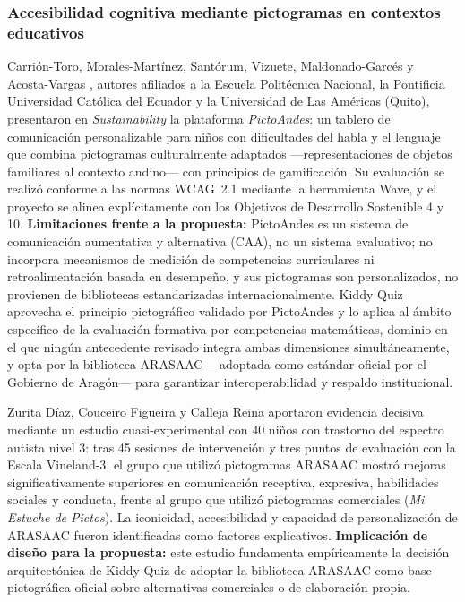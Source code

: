 \subsubsection{Accesibilidad cognitiva mediante pictogramas en contextos educativos}

Carrión-Toro, Morales-Martínez, Santórum, Vizuete, Maldonado-Garcés y Acosta-Vargas \cite{carriontoro2025pictoandes}, autores afiliados a la Escuela Politécnica Nacional, la Pontificia Universidad Católica del Ecuador y la Universidad de Las Américas (Quito), presentaron en \textit{Sustainability} la plataforma \textit{PictoAndes}: un tablero de comunicación personalizable para niños con dificultades del habla y el lenguaje que combina pictogramas culturalmente adaptados ---representaciones de objetos familiares al contexto andino--- con principios de gamificación. Su evaluación se realizó conforme a las normas WCAG~2.1 mediante la herramienta Wave, y el proyecto se alinea explícitamente con los Objetivos de Desarrollo Sostenible 4 y 10. \textbf{Limitaciones frente a la propuesta:} PictoAndes es un sistema de comunicación aumentativa y alternativa (CAA), no un sistema evaluativo; no incorpora mecanismos de medición de competencias curriculares ni retroalimentación basada en desempeño, y sus pictogramas son personalizados, no provienen de bibliotecas estandarizadas internacionalmente. Kiddy Quiz aprovecha el principio pictográfico validado por PictoAndes y lo aplica al ámbito específico de la evaluación formativa por competencias matemáticas, dominio en el que ningún antecedente revisado integra ambas dimensiones simultáneamente, y opta por la biblioteca ARASAAC ---adoptada como estándar oficial por el Gobierno de Aragón--- para garantizar interoperabilidad y respaldo institucional.

Zurita Díaz, Couceiro Figueira y Calleja Reina \cite{zurita2026arasaac} aportaron evidencia decisiva mediante un estudio cuasi-experimental con 40 niños con trastorno del espectro autista nivel 3: tras 45 sesiones de intervención y tres puntos de evaluación con la Escala Vineland-3, el grupo que utilizó pictogramas ARASAAC mostró mejoras significativamente superiores en comunicación receptiva, expresiva, habilidades sociales y conducta, frente al grupo que utilizó pictogramas comerciales (\textit{Mi Estuche de Pictos}). La iconicidad, accesibilidad y capacidad de personalización de ARASAAC fueron identificadas como factores explicativos. \textbf{Implicación de diseño para la propuesta:} este estudio fundamenta empíricamente la decisión arquitectónica de Kiddy Quiz de adoptar la biblioteca ARASAAC como base pictográfica oficial sobre alternativas comerciales o de elaboración propia.

